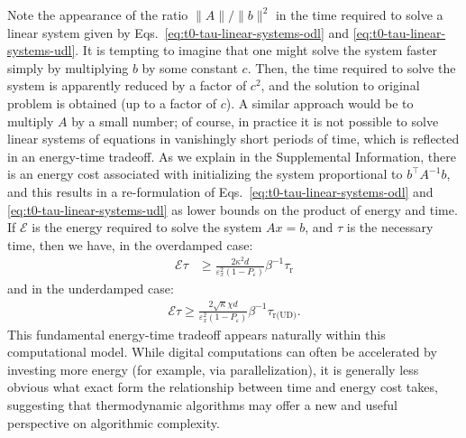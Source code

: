 \documentclass[prx,onecolumn,floatfix,longbibliography,notitlepage, nofootinbib,12pt]{revtex4-2}
\renewcommand{\geq}{\geqslant}
\begin{document}
Note the appearance of the ratio $\|A\|/\|b\|^2$ in the time required to solve a linear system given by Eqs.~\eqref{eq:t0-tau-linear-systems-odl} and \eqref{eq:t0-tau-linear-systems-udl}. It is tempting to imagine that one might solve the system faster simply by multiplying $b$ by some constant $c$. Then, the time required to solve the system is apparently reduced by a factor of $c^2$, and the solution to original problem is obtained (up to a factor of $c$). A similar approach would be to multiply $A$ by a small number; of course, in practice it is not possible to solve linear systems of equations in vanishingly short periods of time, which is reflected in an energy-time tradeoff. As we explain in the Supplemental Information, there is an energy cost associated with initializing the system proportional to $b^\intercal A^{-1} b$, and this results in a re-formulation of Eqs.~\eqref{eq:t0-tau-linear-systems-odl} and \eqref{eq:t0-tau-linear-systems-udl} as lower bounds on the product of energy and time. If $\mathcal{E}$ is the energy required to solve the system $A x = b$, and $\tau$ is the necessary time, then we have, in the overdamped case:
\begin{align}
\label{eq:time-energy-odl}
    \mathcal{E}\tau &\geq \frac{2 \kappa^2 d  }{ \varepsilon_x^2 (1-P_\varepsilon)} \beta^{-1}\tau_\text{r}
\end{align}
and in the underdamped case:
\begin{align}
\label{time-energy-udl}
    \mathcal{E}\tau \geq  \frac{2\sqrt{\kappa} \chi  d}{  \varepsilon_x^2(1-P_\varepsilon)} \beta^{-1}\tau_{\text{r(UD)}}.
\end{align}
This fundamental energy-time tradeoff appears naturally within this computational model. While digital computations can often be accelerated by investing more energy (for example, via parallelization), it is generally less obvious what exact form the relationship between time and energy cost takes, suggesting that thermodynamic algorithms may offer a new and useful perspective on algorithmic complexity.
\end{document}
